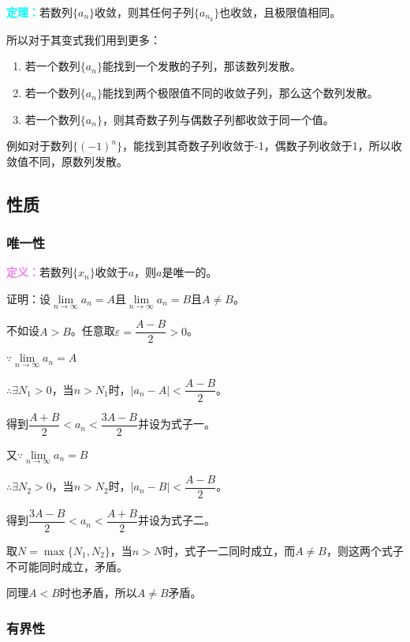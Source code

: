 \documentclass[UTF8, 12pt]{ctexart}
\begin{document}
\textcolor{aqua}{\textbf{定理：}}若数列$\{a_n\}$收敛，则其任何子列$\{a_{n_k}\}$也收敛，且极限值相同。

所以对于其变式我们用到更多：

\begin{enumerate}
    \item 若一个数列$\{a_n\}$能找到一个发散的子列，那该数列发散。
    \item 若一个数列$\{a_n\}$能找到两个极限值不同的收敛子列，那么这个数列发散。
    \item 若一个数列$\{a_n\}$，则其奇数子列与偶数子列都收敛于同一个值。
\end{enumerate}

例如对于数列$\{(-1)^n\}$，能找到其奇数子列收敛于-1，偶数子列收敛于1，所以收敛值不同，原数列发散。

\subsection{性质}
\subsubsection{唯一性}

\textcolor{violet}{\textbf{定义：}}若数列$\{x_n\}$收敛于$a$，则$a$是唯一的。

证明：设$\lim\limits_{n\to\infty}a_n=A$且$\lim\limits_{n\to\infty}a_n=B$且$A\neq B$。

不如设$A>B$。任意取$\varepsilon=\dfrac{A-B}{2}>0$。

$\because\lim\limits_{n\to\infty}a_n=A$

$\therefore\exists N_1>0$，当$n>N_1$时，$\vert a_n-A\vert<\dfrac{A-B}{2}$。

得到$\dfrac{A+B}{2}<a_n<\dfrac{3A-B}{2}$并设为式子一。

又$\because\lim\limits_{n\to\infty}a_n=B$

$\therefore\exists N_2>0$，当$n>N_2$时，$\vert a_n-B\vert<\dfrac{A-B}{2}$。

得到$\dfrac{3A-B}{2}<a_n<\dfrac{A+B}{2}$并设为式子二。

取$N=\max\{N_1,N_2\}$，当$n>N$时，式子一二同时成立，而$A\neq B$，则这两个式子不可能同时成立，矛盾。

同理$A<B$时也矛盾，所以$A\neq B$矛盾。

\subsubsection{有界性}
\end{document}
